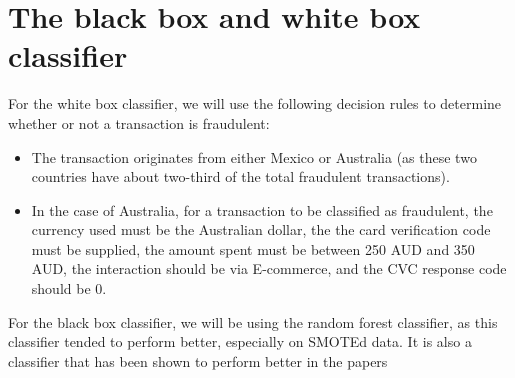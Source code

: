 \documentclass[]{article}
\begin{document}
\section{The black box and white box classifier}
For the white box classifier, we will use the following decision rules to determine whether or not a transaction is fraudulent:
\begin{itemize}
	\item The transaction originates from either Mexico or Australia (as these two countries have about two-third of the total fraudulent transactions).
	\item In the case of Australia, for a transaction to be classified as fraudulent, the currency used must be the Australian dollar, the the card verification code must be supplied, the amount spent must be between 250 AUD and 350 AUD, the interaction should be via E-commerce, and the CVC response code should be 0.
\end{itemize}
For the black box classifier, we will be using the random forest classifier, as this classifier tended to perform better, especially on SMOTEd data. It is also a classifier that has been shown to perform better in the papers
\end{document}
